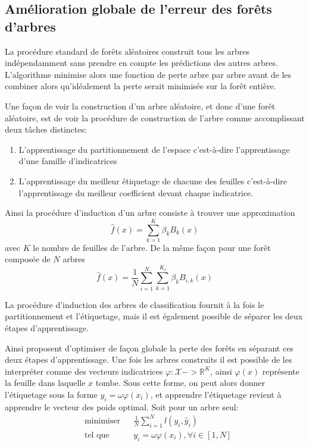
\subsection{Amélioration globale de l'erreur des forêts d'arbres}

La procédure standard de forêts aléatoires construit tous les arbres indépendamment sans prendre en compte les prédictions des autres arbres. L'algorithme minimise alors une fonction de perte arbre par arbre avant de les combiner alors qu'idéalement la perte serait minimisée sur la forêt entière. 

Une façon de voir la construction d'un arbre aléatoire, et donc d'une forêt aléatoire, est de voir la procédure de construction de l'arbre comme accomplissant deux tâches distinctes:
\begin{enumerate}
    \item L'apprentissage du  partitionnement de l'espace c'est-à-dire l'apprentissage d'une famille d'indicatrices
    \item L'apprentissage du meilleur étiquetage de chacune des feuilles c'est-à-dire l'apprentissage du meilleur coefficient devant chaque indicatrice.
\end{enumerate}

Ainsi la procédure d'induction d'un arbre consiste à trouver une approximation
\begin{equation}
    \hat{f} (x) = \sum_{k=1}^K \beta_k B_k (x)     
\end{equation}
avec $K$ le nombre de feuilles de l'arbre.
De la même façon pour une forêt composée de $N$ arbres
\begin{equation}
    \hat{f} (x) = \frac{1}{N} \sum_{i=1}^N \sum_{k=1}^{K_i} \beta_k B_{i,k} (x)
\end{equation}

La procédure d'induction des arbres de classification fournit à la fois le partitionnement et l'étiquetage, mais il est également possible de séparer les deux étapes d'apprentissage.

Ainsi \citet{Ren2015} proposent d'optimiser de façon globale la perte des forêts en séparant ces deux étapes d'apprentissage. Une fois les arbres construits il est possible de les interpréter comme des vecteurs indicatrices $\varphi : \mathcal{X} -> \mathbb{R}^K$, ainsi $\varphi (x)$ représente la feuille dans laquelle $x$ tombe. Sous cette forme, on peut alors donner l'étiquetage sous la forme $y_i = \omega \varphi (x_i)$, et apprendre l'étiquetage revient à apprendre le vecteur des poids optimal. Soit pour un arbre seul:
\begin{equation*}
    \begin{aligned}
        & \text{minimiser}
        & & \frac{1}{N} \sum_{i=1}^N l(y_i , \hat{y}_i ) \\
        & \text{tel que} 
        & & y_i = \omega \varphi (x_i ) , \forall i \in [1,N]
    \end{aligned}
\end{equation*}

